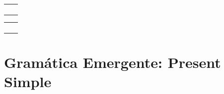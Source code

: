 \documentclass[12pt,a4paper]{article}
\begin{document}
\begin{cajachunk}
\begin{multicols}{2}
\begin{tabularx}{\linewidth}{@{} X l @{}}
\eng{in the morning} & \esp{en la mañana} \\
\eng{in the afternoon} & \esp{en la tarde} \\
\eng{in the evening} & \esp{en la noche} \\
\eng{at night} & \esp{de noche} \\
\end{tabularx}

\columnbreak

\begin{tabularx}{\linewidth}{@{} X l @{}}
\eng{every day} & \esp{todos los días} \\
\eng{every morning} & \esp{todas las mañanas} \\
\eng{at \underline{\hspace{1cm}} o'clock} & \esp{a las \underline{\hspace{1cm}}} \\
\eng{on Monday(s)} & \esp{los lunes} \\
\end{tabularx}
\end{multicols}
\end{cajachunk}

\section{Gramática Emergente: Present Simple}
\end{document}
